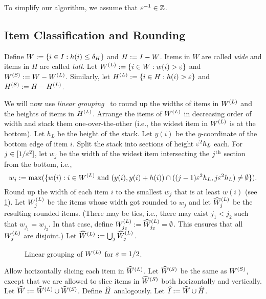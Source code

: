 To simplify our algorithm, we assume that $\varepsilon^{-1} \in \mathbb{Z}$.

\subsection{Item Classification and Rounding}
\label{sec:bp-algo:round}

Define $W := \{i \in I: h(i) \le \delta_H \}$ and $H := I - W$.
Items in $W$ are called \emph{wide} and items in $H$ are called \emph{tall}.
Let $W^{(L)} := \{i \in W: w(i) > \varepsilon \}$ and $W^{(S)} := W - W^{(L)}$.
Similarly, let $H^{(L)} := \{i \in H: h(i) > \varepsilon \}$ and $H^{(S)} := H - H^{(L)}$.

We will now use \emph{linear grouping}~\cite{bp-aptas,kenyon1996strip}
to round up the widths of items in $W^{(L)}$ and the heights of items in $H^{(L)}$.
Arrange the items of $W^{(L)}$ in decreasing order of width and stack them
one-over-the-other (i.e., the widest item in $W^{(L)}$ is at the bottom).
Let $h_L$ be the height of the stack.
Let $y(i)$ be the $y$-coordinate of the bottom edge of item $i$.
Split the stack into sections of height $\varepsilon^2h_L$ each.
For $j \in [1/\varepsilon^2]$, let $w_j$ be the width of the
widest item intersecting the $j^{\textrm{th}}$ section from the bottom, i.e.,
\[ w_j := \max(\{w(i): i \in W^{(L)} \textrm{ and } (y(i), y(i) + h(i))
    \cap ((j-1)\varepsilon^2 h_L, j\varepsilon^2 h_L) \neq \emptyset\}). \]
Round up the width of each item $i$ to the smallest $w_j$ that is at least $w(i)$
(see \cref{fig:tall-lingroup-2}).
Let $W^{(L)}_j$ be the items whose width got rounded to $w_j$
and let $\widehat{W}^{(L)}_j$ be the resulting rounded items.
(There may be ties, i.e., there may exist $j_1 < j_2$ such that $w_{j_1} = w_{j_2}$.
In that case, define $W^{(L)}_{j_2} := \widehat{W}^{(L)}_{j_2} = \emptyset$.
This ensures that all $W^{(L)}_j$ are disjoint.)
Let $\widehat{W}^{(L)} := \bigcup_j \widehat{W}^{(L)}_j$.

\begin{figure}[htb]
\centering

\caption{Linear grouping of $W^{(L)}$ for $\varepsilon = 1/2$.}
\label{fig:tall-lingroup-2}
\end{figure}

Allow horizontally slicing each item in $\widehat{W}^{(L)}$.
Let $\widehat{W}^{(S)}$ be the same as $W^{(S)}$, except that we are allowed
to slice items in $\widehat{W}^{(S)}$ both horizontally and vertically.
Let $\widehat{W} := \widehat{W}^{(L)} \cup \widehat{W}^{(S)}$.
Define $\widehat{H}$ analogously. Let $\widehat{I} := \widehat{W} \cup \widehat{H}$.


